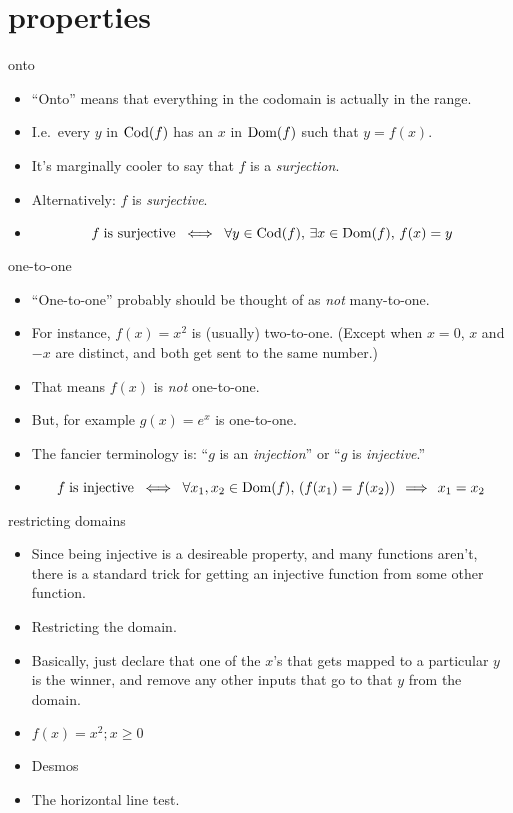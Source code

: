 \documentclass[handout,landscape]{beamer}
\begin{document}
\section{properties}

\begin{frame}{onto}
\begin{itemize}
\item ``Onto'' means that everything in the codomain is actually in the range.\pause
\item I.e.\ every $y$ in $\mbox{Cod}(f)$ has an $x$ in $\mbox{Dom}(f)$ such that $y=f(x)$.
\item It's marginally cooler to say that $f$ is a {\em surjection}. \pause
\item Alternatively: $f$ is {\em surjective}. \pause
\item 
\[ f \; \mbox{is surjective} \; \iff \; \forall y \in \mbox{Cod}(f), \, \exists x \in \mbox{Dom}(f), \, f(x) = y \]
\end{itemize}
\end{frame}

\begin{frame}{one-to-one}
\begin{itemize}
\item ``One-to-one'' probably should be thought of as {\em not} many-to-one. \pause
\item For instance, $f(x) = x^2$ is (usually) two-to-one. \pause \newline
(Except when $x=0$, $x$ and $-x$ are distinct, and both get sent to the same number.)\pause
\item That means $f(x)$ is {\em not} one-to-one. \pause
\item But, for example $g(x) = e^x$ is one-to-one.
\item The fancier terminology is: ``$g$ is an {\em injection}'' or ``$g$ is {\em injective}.'' \pause
\item 
\[ f \; \mbox{is injective} \; \iff \; \forall x_1, x_2 \in \mbox{Dom}(f), \, (f(x_1) = f(x_2))\, \implies \, x_1 = x_2 \]
\end{itemize}
\end{frame}

\begin{frame}{restricting domains}
\begin{itemize}
\item Since being injective is a desireable property, and many functions aren't, there is a standard trick for getting an injective function from some other function.\pause
\item Restricting the domain.\pause
\item Basically, just declare that one of the $x$'s that gets mapped to a particular $y$ is the winner, and remove any other inputs that go to that $y$ from the domain. \pause
\item $f(x) = x^2; x \geq 0$ \pause
\item Desmos
\item The horizontal line test.
\end{itemize}
\end{frame}
\end{document}
